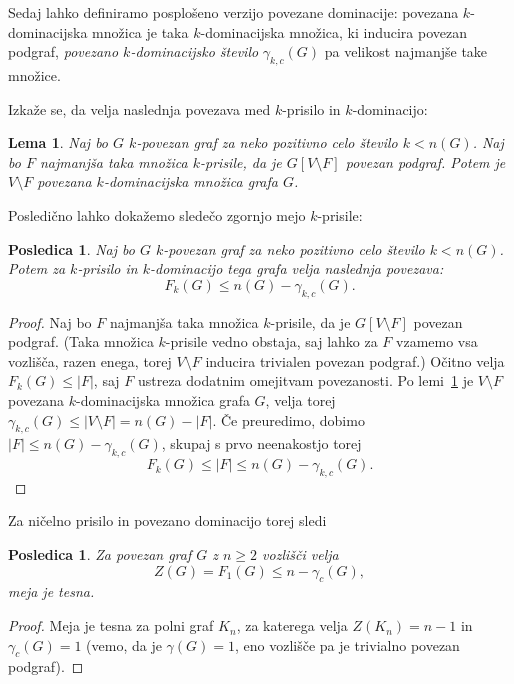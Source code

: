 \documentclass[12pt,a4paper,twoside]{article}
\theoremstyle{definition} %
\theoremstyle{plain} %
\newtheorem{lema}[definicija]{Lema}
\newtheorem{posledica}[definicija]{Posledica}
\numberwithin{equation}{section}  %
\begin{document}
Sedaj lahko definiramo posplošeno verzijo povezane dominacije: povezana $k$-dominacijska množica je taka $k$-dominacijska množica, ki inducira povezan podgraf, \emph{povezano $k$-dominacijsko število} $\gamma_{k,c}(G)$ pa velikost najmanjše take množice.

Izkaže se, da velja naslednja povezava med $k$-prisilo in $k$-dominacijo:
\begin{lema}{{\cite[lema 4.1]{amos2015kforcing}}}
    \label{lem:k-prisila-povezana-k-dominacija}
    Naj bo $G$ $k$-povezan graf za neko pozitivno celo število $k < n(G)$. Naj bo $F$ najmanjša taka množica $k$-prisile, da je $G[V \setminus F]$ povezan podgraf. Potem je $V \setminus F$ povezana $k$-dominacijska množica grafa $G$.
\end{lema}
Posledično lahko dokažemo sledečo zgornjo mejo $k$-prisile:
\begin{posledica}{{\cite[posledica 4.2]{amos2015kforcing}}}
    Naj bo $G$ $k$-povezan graf za neko pozitivno celo število $k < n(G)$. Potem za $k$-prisilo in $k$-dominacijo tega grafa velja naslednja povezava:
    \[ F_k(G) \leq n(G) - \gamma_{k,c}(G). \]
\end{posledica}
\begin{proof}
    Naj bo $F$ najmanjša taka množica $k$-prisile, da je $G[V \setminus F]$ povezan podgraf. (Taka množica $k$-prisile vedno obstaja, saj lahko za $F$ vzamemo vsa vozlišča, razen enega, torej $V \setminus F$ inducira trivialen povezan podgraf.) Očitno velja $F_k(G) \leq |F|$, saj $F$ ustreza dodatnim omejitvam povezanosti.
    Po lemi~\ref{lem:k-prisila-povezana-k-dominacija} je $V \setminus F$ povezana $k$-dominacijska množica grafa $G$, velja torej $\gamma_{k, c}(G) \leq |V \setminus F| = n(G) - |F|$. Če preuredimo, dobimo $|F| \leq n(G) - \gamma_{k, c}(G)$, skupaj s prvo neenakostjo torej
    \[ F_k(G) \leq |F| \leq  n(G) - \gamma_{k, c}(G).\]
\end{proof}

Za ničelno prisilo in povezano dominacijo torej sledi
\begin{posledica}
    Za povezan graf $G$ z $n \geq 2$ vozlišči velja
    \[ Z(G) = F_1(G) \leq n - \gamma_c(G), \]
    meja je tesna.
\end{posledica}
\begin{proof}
    Meja je tesna za polni graf $K_n$, za katerega velja $Z(K_n) = n-1$ in $\gamma_c(G) = 1$ (vemo, da je $\gamma(G) = 1$, eno vozlišče pa je trivialno povezan podgraf).
\end{proof}
\end{document}
